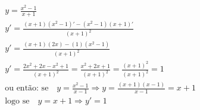 \begin{ex}
\begin{align}
&y=\frac{x^2-1}{x+1}\nonumber\\
&y'=\frac{(x+1)(x^2-1)'-(x^2-1)(x+1)'}{(x+1)^2}\nonumber\\
&y'=\frac{(x+1)(2x)-(1)(x^2-1)}{(x+1)^2}\nonumber\\
&y'=\frac{2x^2+2x-x^2+1}{(x+1)^2}=\frac{x^2+2x+1}{(x+1)^2}=\frac{(x+1)^2}{(x+1)^2}=1\nonumber\\
&\text{ou então: se}\quad y=\frac{x^2-1}{x-1} \Rightarrow y=\frac{(x+1)(x-1)}{x-1}=x+1\nonumber\\
&\text{logo se}\quad y=x+1 \Rightarrow y'=1\nonumber
\end{align}
\end{ex}
